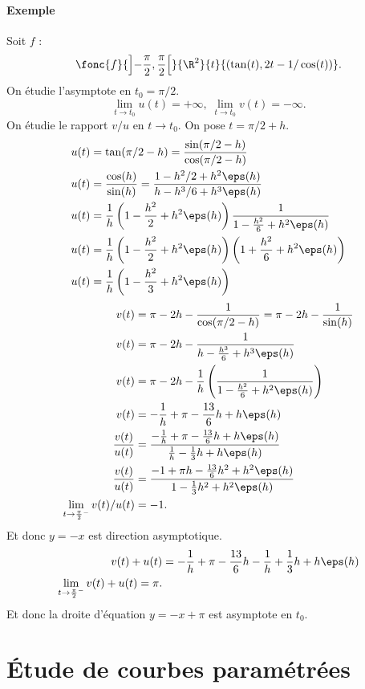 \documentclass{mybourbaki}
\begin{document}
\paragraph{Exemple}Soit $f$ : \[ \fonc{f}{\left]-\frac{\pi}{2},\frac{\pi}{2}\right[}{\R^{2}}{t}{(\tan(t),2t-1/\cos(t))}.\]On étudie l'asymptote en $t_0 = \pi/2$. \[\lim_{t\to t_0} u(t) = +\infty, \; \lim_{t\to t_0}v(t) = -\infty.\]On étudie le rapport $v/u$ en $t\to t_0$. On pose $t=\pi/2+h$.
\begin{align*}
u(t) &= \tan(\pi/2-h) = \frac{\sin(\pi/2-h)}{\cos(\pi/2-h)}\\
u(t) &= \frac{\cos (h)}{\sin (h)} = \frac{1 -h^{2}/2 + h^{2}\eps(h)}{h-h^{3}/6 + h^{3}\eps(h)}\\
u(t) &= \frac{1}{h}\left(1-\frac{h^{2}}{2}+h^{2}\eps(h)\right)\frac{1}{1-\frac{h^{2}}{6} + h^{2}\eps(h)}\\
u(t) &= \frac{1}{h}\left(1 -\frac{h^{2}}{2} + h^{2}\eps(h) \right)\left( 1+ \frac{h^{2}}{6} + h^{2}\eps(h) \right)\\
u(t) &= \frac{1}{h}\left( 1 - \frac{h^{2}}{3} + h^{2}\eps(h)\right)\\
\end{align*}
\begin{align*}
v(t) &= \pi - 2h - \frac{1}{\cos(\pi/2-h)} = \pi - 2h - \frac{1}{\sin(h)}\\
v(t) &= \pi - 2h - \frac{1}{h-\frac{h^{3}}{6} + h^{3}\eps(h)}\\
v(t) &= \pi - 2h- \frac{1}{h}\left(\frac{1}{1-\frac{h^{2}}{6}+h^{2}\eps(h)}\right)\\
v(t) &=-\frac{1}{h} + \pi-\frac{13}{6}h + h\eps(h) \\
\frac{v(t)}{u(t)} &= \frac{-\frac{1}{h}+\pi-\frac{13}{6}h + h\eps(h)}{\frac{1}{h}-\frac{1}{3}h + h\eps(h)}\\
\frac{v(t)}{u(t)} &= \frac{-1+\pi h -\frac{13}{6}h^{2} + h^{2}\eps(h)}{1-\frac{1}{3}h^{2}+h^{2}\eps(h)}\\
\lim_{t\to \frac{\pi}{2}^{-}} v(t)/u(t) &= -1.
\end{align*}
Et donc $y=-x$ est direction asymptotique.
\begin{align*}
v(t) + u(t) &= -\frac{1}{h} + \pi -\frac{13}{6}h - \frac{1}{h} + \frac{1}{3}h + h\eps(h) \\
\lim_{t\to \frac{\pi}{2}^{-}}v(t)+u(t) = \pi.
\end{align*}
Et donc la droite d'équation $y=-x+\pi$ est asymptote en $t_0$.

\section{\'Etude de courbes paramétrées}
\end{document}
